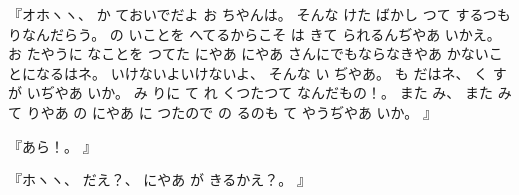%
『オホヽヽ、
%
か
ておいでだよ
お
ちやんは。
%
そんな
けた
ばかし
つて
するつもりなんだらう。
%
の
いことを
へてるからこそ
は
きて
られるんぢやあ
いかえ。
%
お
たやうに
なことを
つてた
にやあ
にやあ
さんにでもならなきやあ
かないことになるはネ。
%
いけないよいけないよ、
%
そんな
い
ぢやあ。
%
も
だはネ、
%
く
すが
いぢやあ
いか。
%
み
りに
て
れ
くつたつて
なんだもの！。
%
また
み、
%
また
み
て
りやあ
の
にやあ
に
つたので
の
るのも
て
やうぢやあ
いか。
』

%
『あら！。
』

%
『ホヽヽ、
%
だえ？、
%
にやあ
が
きるかえ？。
』
